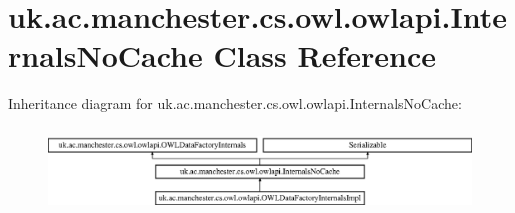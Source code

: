 \hypertarget{classuk_1_1ac_1_1manchester_1_1cs_1_1owl_1_1owlapi_1_1_internals_no_cache}{\section{uk.\-ac.\-manchester.\-cs.\-owl.\-owlapi.\-Internals\-No\-Cache Class Reference}
\label{classuk_1_1ac_1_1manchester_1_1cs_1_1owl_1_1owlapi_1_1_internals_no_cache}
}
Inheritance diagram for uk.\-ac.\-manchester.\-cs.\-owl.\-owlapi.\-Internals\-No\-Cache\-:\begin{figure}[H]
\begin{center}
\leavevmode
\includegraphics[height=2.258065cm]{classuk_1_1ac_1_1manchester_1_1cs_1_1owl_1_1owlapi_1_1_internals_no_cache}
\end{center}
\end{figure}
